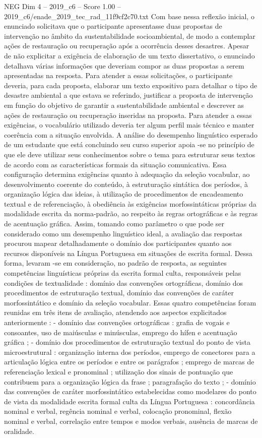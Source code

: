 \begin{textsample}{NEG Dim 4 – 2019\_c6 – Score 1.00 – 2019\_c6/enade\_2019\_tec\_rad\_11f9cf2c70.txt}
Com base nessa reflexão inicial, o enunciado solicitava que o participante apresentasse duas propostas de intervenção no âmbito da sustentabilidade socioambiental, de modo a contemplar ações de restauração ou recuperação após a ocorrência desses desastres.
Apesar de não explicitar a exigência de elaboração de um texto dissertativo, o enunciado detalhava várias informações que deveriam compor as duas propostas a serem apresentadas na resposta.
Para atender a essas solicitações, o participante deveria, para cada proposta, elaborar um texto expositivo para detalhar o tipo de desastre ambiental a que estava se referindo, justificar a proposta de intervenção em função do objetivo de garantir a sustentabilidade ambiental e descrever as ações de restauração ou recuperação inseridas na proposta.
Para atender a essas exigências, o vocabulário utilizado deveria ter algum perfil mais técnico e manter coerência com a situação envolvida.
A análise do desempenho linguístico esperado de um estudante que está concluindo seu curso superior apoia -se no princípio de que ele deve utilizar seus conhecimentos sobre o tema para estruturar seus textos de acordo com as características formais da situação comunicativa.
Essa configuração determina exigências quanto à adequação da seleção vocabular, ao desenvolvimento coerente do conteúdo, à estruturação sintática dos períodos, à organização lógica das ideias, à utilização de procedimentos de encadeamento textual e de referenciação, à obediência às exigências morfossintáticas próprias da modalidade escrita da norma-padrão, ao respeito às regras ortográficas e às regras de acentuação gráfica.
Assim, tomando como parâmetro o que pode ser considerado como um desempenho linguístico ideal, a avaliação das respostas procurou mapear detalhadamente o domínio dos participantes quanto aos recursos disponíveis na Língua Portuguesa em situações de escrita formal.
Dessa forma, levaram -se em consideração, no padrão de resposta, as seguintes competências linguísticas próprias da escrita formal culta, responsáveis pelas condições de textualidade : domínio das convenções ortográficas, domínio dos procedimentos de estruturação textual, domínio das convenções de caráter morfossintático e domínio da seleção vocabular.
Essas quatro competências foram reunidas em três itens de avaliação, atendendo aos aspectos explicitados anteriormente : - domínio das convenções ortográficas : grafia de vogais e consoantes, uso de maiúsculas e minúsculas, emprego do hífen e acentuação gráfica ; - domínio dos procedimentos de estruturação textual do ponto de vista microestrutural : organização interna dos períodos, emprego de conectores para a articulação lógica entre os períodos e entre os parágrafos ; emprego de marcas de referenciação lexical e pronominal ; utilização dos sinais de pontuação que contribuem para a organização lógica da frase ; paragrafação do texto ; - domínio das convenções de caráter morfossintático estabelecidas como modelares do ponto de vista da modalidade escrita formal culta da Língua Portuguesa : concordância nominal e verbal, regência nominal e verbal, colocação pronominal, flexão nominal e verbal, correlação entre tempos e modos verbais, ausência de marcas de oralidade.

\end{textsample}
